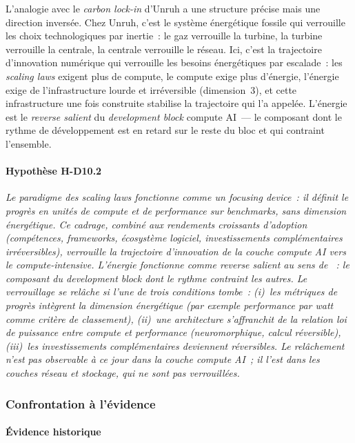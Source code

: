 L'analogie avec le \emph{carbon lock-in} d'Unruh a une structure précise mais une direction inversée. Chez Unruh, c'est le système énergétique fossile qui verrouille les choix technologiques par inertie~: le gaz verrouille la turbine, la turbine verrouille la centrale, la centrale verrouille le réseau. Ici, c'est la trajectoire d'innovation numérique qui verrouille les besoins énergétiques par escalade~: les \emph{scaling laws} exigent plus de compute, le compute exige plus d'énergie, l'énergie exige de l'infrastructure lourde et irréversible (dimension~3), et cette infrastructure une fois construite stabilise la trajectoire qui l'a appelée. L'énergie est le \emph{reverse salient} du \emph{development block} compute AI~--- le composant dont le rythme de développement est en retard sur le reste du bloc et qui contraint l'ensemble.

\paragraph{Hypothèse H-D10.2}
\emph{Le paradigme des \emph{scaling laws} fonctionne comme un \emph{focusing device}~: il définit le progrès en unités de compute et de performance sur \emph{benchmarks}, sans dimension énergétique. Ce cadrage, combiné aux rendements croissants d'adoption (compétences, \emph{frameworks}, écosystème logiciel, investissements complémentaires irréversibles), verrouille la trajectoire d'innovation de la couche compute AI vers le compute-intensive. L'énergie fonctionne comme \emph{reverse salient} au sens de \textcite{hughes_networks_1983}~: le composant du \emph{development block} dont le rythme contraint les autres. Le verrouillage se relâche si l'une de trois conditions tombe~: (i)~les métriques de progrès intègrent la dimension énergétique (par exemple performance par watt comme critère de classement), (ii)~une architecture s'affranchit de la relation loi de puissance entre compute et performance (neuromorphique, calcul réversible), (iii)~les investissements complémentaires deviennent réversibles. Le relâchement n'est pas observable à ce jour dans la couche compute AI~; il l'est dans les couches réseau et stockage, qui ne sont pas verrouillées.}


\subsubsection{Confrontation à l'évidence}


\paragraph{Évidence historique}

